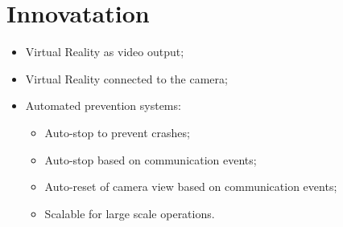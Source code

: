 \section{Innovatation}

\begin{frame}{\secname}
	\begin{itemize}
		\item Virtual Reality as video output;
		\item Virtual Reality connected to the camera;
		\item Automated prevention systems:
		\begin{itemize}
			\item Auto-stop to prevent crashes;
			\item Auto-stop based on communication events;
			\item Auto-reset of camera view based on communication events;
			\item Scalable for large scale operations.
		\end{itemize}
	\end{itemize}
\end{frame}

